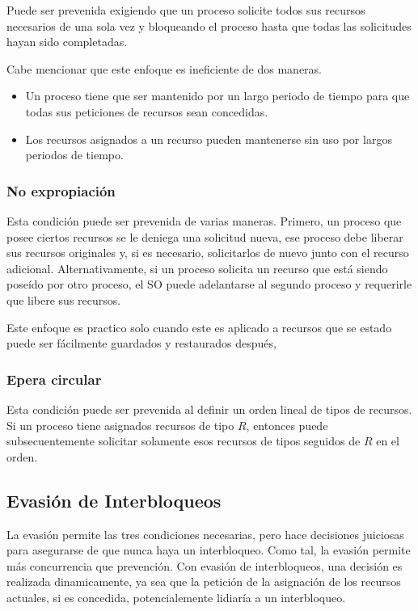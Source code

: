 \documentclass[12pt, a4paper]{article} %
\begin{document}
Puede ser prevenida exigiendo que un proceso solicite todos sus recursos necesarios de una sola vez y bloqueando el proceso hasta que todas las solicitudes hayan sido completadas.

Cabe mencionar que este enfoque es ineficiente de dos maneras.

\begin{itemize}
	\item Un proceso tiene que ser mantenido por un largo periodo de tiempo para que todas sus peticiones de recursos sean concedidas.
	\item Los recursos asignados a un recurso pueden mantenerse sin uso por largos periodos de tiempo.
\end{itemize}

\subsubsection{No expropiación}

Esta condición puede ser prevenida de varias maneras. Primero, un proceso que posee ciertos recursos se le deniega una solicitud nueva, ese proceso  debe liberar sus recursos originales y, si es necesario, solicitarlos de nuevo junto con el recurso adicional. Alternativamente, si un proceso solicita un recurso que está siendo poseído por otro proceso, el SO puede adelantarse al segundo proceso y requerirle que libere sus recursos.

Este enfoque es practico solo cuando este es aplicado a recursos que se estado puede ser fácilmente guardados y restaurados después,

\subsubsection{Epera circular}

Esta condición puede ser prevenida al definir un orden lineal de tipos de recursos. Si un proceso tiene asignados recursos de tipo $R$, entonces puede subsecuentemente solicitar solamente esos recursos de tipos seguidos de $R$ en el orden.

\subsection{Evasión de Interbloqueos}

La evasión permite las tres condiciones necesarias, pero hace decisiones juiciosas para asegurarse de que nunca haya un interbloqueo. Como tal, la evasión permite más concurrencia que prevención. Con evasión de interbloqueos, una decisión es realizada dinamicamente, ya sea que la petición de la asignación de los recursos actuales, si es concedida, potencialemente lidiaría a un interbloqueo.
\end{document}
